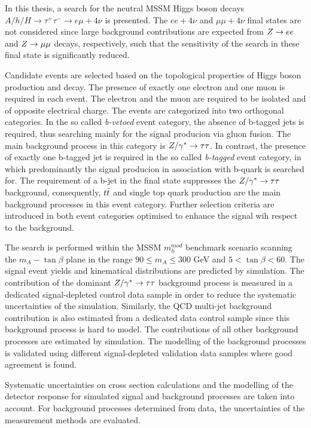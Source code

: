 In this thesis, a search for the neutral MSSM Higgs boson decays
$A/h/H \rightarrow \tau^+ \tau^- \rightarrow e \mu +4\nu$ is presented. The $ee +4\nu$ and $\mu\mu +4\nu$ final states 
are not considered since  large background contributions are expected  from $Z\rightarrow ee$ and $Z\rightarrow \mu\mu$ decays,  respectively, 
such that the sensitivity of the search in these final
state is significantly reduced.

Candidate events are selected based on the topological properties of Higgs boson production
and decay. The  presence of exactly one electron and one muon is required in each event. The electron and the muon are required to be 
 isolated and of opposite electrical charge.
The  events are categorized into two orthogonal categories. In the so called  \emph{b-vetoed} event category,
the absence of b-tagged jets is required, 
thus searching mainly for the signal producion via gluon fusion. The main background 
process in  this category is $Z/\gamma^*\rightarrow \tau\tau$. 
In contrast, the presence of exactly one  b-tagged jet is required in the so called \emph{b-tagged} event category, 
in which predominantly the signal producion in association with b-quark is searched for. The requirement of a b-jet 
in the final state suppresses the $Z/\gamma^*\rightarrow \tau\tau$ background, consequently, $t\bar{t}$ and single top quark  production
are the main background processes in this event category. Further selection criteria are introduced in both event categories
optimised to enhance the signal wih respect to the background.

The  search is performed within the MSSM $m_h^{mod}$ benchmark scenario
scanning the $m_A - \tan\beta$ plane in the range $90 \leq m_A \leq 300$ GeV and $5 < \tan\beta < 60$.
The signal event yields and kinematical distributions are predicted by simulation.
The contribution of the dominant $Z/\gamma^*\rightarrow \tau\tau$ background process is measured in a dedicated  signal-depleted control data sample
in order to reduce the systematic uncertainties of the simulation. Similarly, the QCD multi-jet background contribution 
is also estimated from a dedicated data control sample since this background process is hard to model. The
contributions of  all  other background processes  are estimated by simulation.
The modelling of the background processes is  validated using different signal-depleted validation data samples where
good agreement is found.

Systematic uncertainties  on cross section calculations and the modelling of the detector response for 
simulated signal and background processes are taken into account. For background processes  determined from  data,
the uncertainties of the measurement methods are evaluated.


